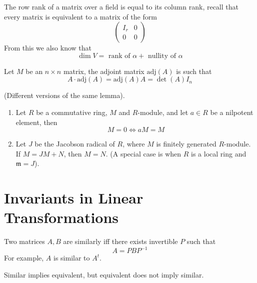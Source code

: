 \documentclass[openany]{book}
\begin{document}
\begin{prop}
    The row rank of a matrix over a field is equal to its column rank, recall that every matrix is equivalent to a matrix of the form 
    \[ 
        \left( 
        \begin{array}{c|c} 
        I_r & 0 \\ 
        \hline 
        0 & 0 
        \end{array} 
        \right) 
        \]
    From this we also know that 
    \begin{equation*}
        \dim V=\text{ rank of }\alpha +\text{ nullity of }\alpha
    \end{equation*}
\end{prop}


\begin{defn}
    Let $M$ be an $n\times n$ matrix, the adjoint matrix $\text{adj}(A)$ is such that 
    \begin{equation*}
        A\cdot\text{adj}(A)=\text{adj}(A)A=\det(A)I_n
    \end{equation*}
\end{defn}

\begin{prop}
    (Different versions of the same lemma).
    \begin{enumerate}
        \item Let $R$ be a commutative ring, $M$ and $R$-module, and let $a\in R$ be a nilpotent element, then
        \begin{equation*}
            M=0\iff aM=M
        \end{equation*}
        \item Let $J$ be the Jacobson radical of $R$, where $M$ is finitely generated $R$-module. If $M=JM+N$, then $M=N$. (A special case is when $R$ is a local ring and $\mathfrak{m}=J$).
    \end{enumerate}
\end{prop}

\section{Invariants in Linear Transformations}

\begin{defn}
    Two matrices $A,B$ are similarly iff there exists invertible $P$ such that 
    \begin{equation*}
        A=PBP^{-1}
    \end{equation*}
    For example, $A$ is similar to $A^t$.
\end{defn}
\begin{prop}
    Similar implies equivalent, but equivalent does not imply similar.
\end{prop}
\end{document}
